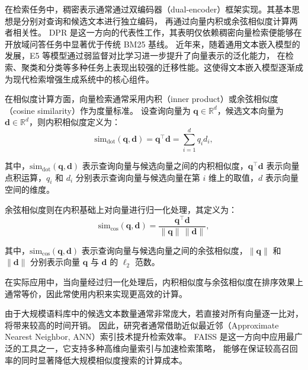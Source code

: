 
在检索任务中，稠密表示通常通过双编码器（dual-encoder）框架实现。其基本思想是分别对查询和候选文本进行独立编码，
再通过向量内积或余弦相似度计算两者相关性。
DPR 是这一方向的代表性工作，其表明仅依赖稠密向量检索便能够在开放域问答任务中显著优于传统 BM25 基线。
近年来，随着通用文本嵌入模型的发展，E5\cite{e5} 等模型通过弱监督对比学习进一步提升了向量表示的泛化能力，
在检索、聚类和分类等多种任务上表现出较强的迁移性能。这使得文本嵌入模型逐渐成为现代检索增强生成系统中的核心组件。

在相似度计算方面，向量检索通常采用内积（inner product）或余弦相似度（cosine similarity）作为度量标准。
设查询向量为 $\mathbf{q} \in \mathbb{R}^d$，候选文本向量为 $\mathbf{d} \in \mathbb{R}^d$，则内积相似度定义为：
\begin{equation}
\text{sim}_{\text{dot}}(\mathbf{q}, \mathbf{d}) = \mathbf{q}^\top \mathbf{d} = \sum_{i=1}^{d} q_i d_i,
\end{equation}

\noindent 其中，$\text{sim}_{\text{dot}}(\mathbf{q}, \mathbf{d})$ 表示查询向量与候选向量之间的内积相似度，$\mathbf{q}^\top \mathbf{d}$ 表示向量点积运算，$q_i$ 和 $d_i$ 分别表示查询向量与候选向量在第 $i$ 维上的取值，$d$ 表示向量空间的维度。

余弦相似度则在内积基础上对向量进行归一化处理，其定义为：
\begin{equation}
\text{sim}_{\cos}(\mathbf{q}, \mathbf{d}) = \frac{\mathbf{q}^\top \mathbf{d}}{\|\mathbf{q}\| \, \|\mathbf{d}\|},
\end{equation}

\noindent 其中，$\text{sim}_{\cos}(\mathbf{q}, \mathbf{d})$ 表示查询向量与候选向量之间的余弦相似度，$\|\mathbf{q}\|$ 和 $\|\mathbf{d}\|$ 分别表示向量 $\mathbf{q}$ 与 $\mathbf{d}$ 的 $\ell_2$ 范数。

在实际应用中，当向量经过归一化处理后，内积相似度与余弦相似度在排序效果上通常等价，因此常使用内积来实现更高效的计算。

由于大规模语料库中的候选文本数量通常非常庞大，若直接对所有向量逐一比对，将带来较高的时间开销。
因此，研究者通常借助近似最近邻（Approximate Nearest Neighbor, ANN）索引技术提升检索效率。
FAISS\cite{faiss} 是这一方向中应用最广泛的工具之一，它支持多种高维向量索引与加速检索策略，
能够在保证较高召回率的同时显著降低大规模相似度搜索的计算成本。

